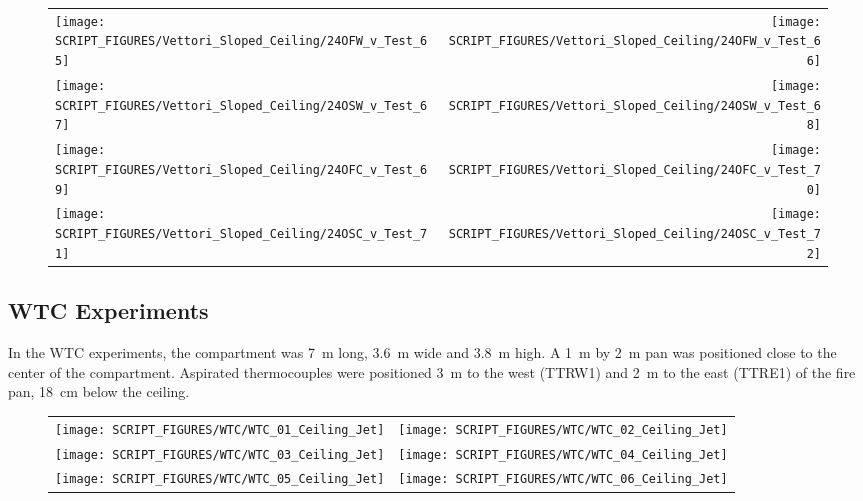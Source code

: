 \begin{figure}[p]
\begin{tabular*}{\textwidth}{l@{\extracolsep{\fill}}r}
\texttt{[image: SCRIPT\_FIGURES/Vettori\_Sloped\_Ceiling/24OFW\_v\_Test\_65]} &
\texttt{[image: SCRIPT\_FIGURES/Vettori\_Sloped\_Ceiling/24OFW\_v\_Test\_66]} \\
\texttt{[image: SCRIPT\_FIGURES/Vettori\_Sloped\_Ceiling/24OSW\_v\_Test\_67]} &
\texttt{[image: SCRIPT\_FIGURES/Vettori\_Sloped\_Ceiling/24OSW\_v\_Test\_68]} \\
\texttt{[image: SCRIPT\_FIGURES/Vettori\_Sloped\_Ceiling/24OFC\_v\_Test\_69]} &
\texttt{[image: SCRIPT\_FIGURES/Vettori\_Sloped\_Ceiling/24OFC\_v\_Test\_70]} \\
\texttt{[image: SCRIPT\_FIGURES/Vettori\_Sloped\_Ceiling/24OSC\_v\_Test\_71]} &
\texttt{[image: SCRIPT\_FIGURES/Vettori\_Sloped\_Ceiling/24OSC\_v\_Test\_72]} \\
\end{tabular*}
\label{Vettori_Sloped_9}
\end{figure}

\clearpage




\subsection{WTC Experiments}

In the WTC experiments, the compartment was 7~m long, 3.6~m wide and 3.8~m high. A 1~m by 2~m pan was positioned close to the center of the compartment. Aspirated thermocouples were positioned 3~m to the west (TTRW1) and 2~m to the east (TTRE1) of the fire pan, 18~cm below the ceiling.


\begin{figure}[h!]
\begin{tabular*}{\textwidth}{l@{\extracolsep{\fill}}r}
\texttt{[image: SCRIPT\_FIGURES/WTC/WTC\_01\_Ceiling\_Jet]} &
\texttt{[image: SCRIPT\_FIGURES/WTC/WTC\_02\_Ceiling\_Jet]} \\
\texttt{[image: SCRIPT\_FIGURES/WTC/WTC\_03\_Ceiling\_Jet]} &
\texttt{[image: SCRIPT\_FIGURES/WTC/WTC\_04\_Ceiling\_Jet]} \\
\texttt{[image: SCRIPT\_FIGURES/WTC/WTC\_05\_Ceiling\_Jet]} &
\texttt{[image: SCRIPT\_FIGURES/WTC/WTC\_06\_Ceiling\_Jet]}
\end{tabular*}
\label{WTC_Jet}
\end{figure}

